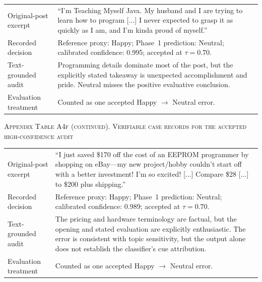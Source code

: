 \documentclass{ieeeaccess}
\begin{document}
\par\medskip
\noindent\begin{tabularx}{\textwidth}{@{}>{\raggedright\arraybackslash}p{}Y@{}}
\toprule
{} \\
\midrule
Original-post excerpt & ``I'm Teaching Myself Java. My husband and I are trying to learn how to program [...] I never expected to grasp it as quickly as I am, and I'm kinda proud of myself.'' \\
Recorded decision & Reference proxy: Happy; Phase~1 prediction: Neutral; calibrated confidence: 0.995; accepted at $\tau=0.70$. \\
Text-grounded audit & Programming details dominate most of the post, but the explicitly stated takeaway is unexpected accomplishment and pride. Neutral misses the positive evaluative conclusion. \\
Evaluation treatment & Counted as one accepted Happy $\rightarrow$ Neutral error. \\
\bottomrule
\end{tabularx}

\clearpage
\noindent\textsc{Appendix Table A4f (continued). Verifiable case records for the accepted high-confidence audit}\par
\smallskip
\noindent\begin{tabularx}{\textwidth}{@{}>{\raggedright\arraybackslash}p{}Y@{}}
\toprule
{} \\
\midrule
Original-post excerpt & ``I just saved \$170 off the cost of an EEPROM programmer by shopping on eBay---my new project/hobby couldn't start off with a better investment! I'm so excited! [...] Compare \$28 [...] to \$200 plus shipping.'' \\
Recorded decision & Reference proxy: Happy; Phase~1 prediction: Neutral; calibrated confidence: 0.989; accepted at $\tau=0.70$. \\
Text-grounded audit & The pricing and hardware terminology are factual, but the opening and stated evaluation are explicitly enthusiastic. The error is consistent with topic sensitivity, but the output alone does not establish the classifier's cue attribution. \\
Evaluation treatment & Counted as one accepted Happy $\rightarrow$ Neutral error. \\
\bottomrule
\end{tabularx}
\end{document}
